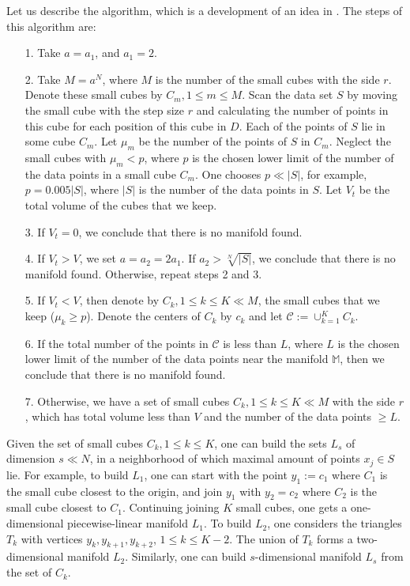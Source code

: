 \documentclass[12pt]{article}
\theoremstyle{plain}
\begin{document}
\noindent Let us describe the algorithm, which is a development of an idea in \cite{Ramm}. The steps of this algorithm are:
\begin{enumerate}
\item[1.] Take $a = a_1$, and $a_1 = 2$.
\item[2.] Take $M = a^N$, where $M$ is the number of the small cubes with the side $r$. Denote these small cubes by $C_m, 1 \leq m \leq M$. Scan the data set
$S$ by moving the small cube with the step size $r$ and calculating the number of points in this cube for each position of this cube in $D$. Each of the points of $S$ lie in some
cube $C_m$. Let $\mu_m$ be the number of the points of $S$ in $C_m$. Neglect
 the small cubes with $\mu_m < p$, where $p$ is the chosen lower limit of the number of the data points in a small cube $C_m$. One chooses $p \ll |S|$, for example, $p=0.005 |S|$, where $|S|$ is the number of the data points in $S$. Let $V_t$ be the total volume of the cubes that we keep.
\item[3.] If $V_t = 0$, we conclude that there is no manifold found.
\item[4.] If $V_t > V$, we set $a = a_2 = 2a_1$. If $a_2 > \sqrt[N]{|S|}$, we conclude that there is no manifold found. Otherwise, repeat steps 2 and 3.
\item[5.] If $V_t < V$, then denote by $C_k, 1 \leq k \leq K \ll M$, the small cubes that we keep ($\mu_k \geq p$). Denote the centers of $C_k$ by $c_k$ and let $\mathcal{C} := \cup_{k=1}^K C_k$.
\item[6.] If the total number of the points in $\mathcal{C}$ is less than $L$, where $L$ is the chosen lower limit of the number of the data points near the manifold $\mathbb{M}$, then we conclude that there is no manifold found.
\item[7.] Otherwise, we have a set of small cubes $C_k, 1 \leq k \leq K \ll M$ with the side $r$, which has total volume less than $V$ and the
number of the data points $\geq L$.
\end{enumerate}

\noindent Given the set of small cubes $C_k, 1 \leq k \leq K$, one can build the sets $L_s$ of dimension $s \ll N$, in a neighborhood of which maximal
 amount of points $x_j \in S$ lie. For example, to build $L_1$, one can start with the point $y_1 := c_1$ where $C_1$ is the small cube closest to the origin, and join $y_1$ with $y_2 = c_2$ where $C_2$ is the small cube closest to $C_1$. Continuing joining $K$ small cubes, one gets a one-dimensional piecewise-linear manifold $L_1$. To build $L_2$, one considers the triangles $T_k$ with vertices $y_k, y_{k + 1}, y_{k + 2}$, $1 \leq k \leq K - 2$. 
   The union of $T_k$ forms a two-dimensional manifold $L_2$. Similarly, one can build $s$-dimensional manifold $L_s$ from the set of $C_k$.\\
\end{document}

